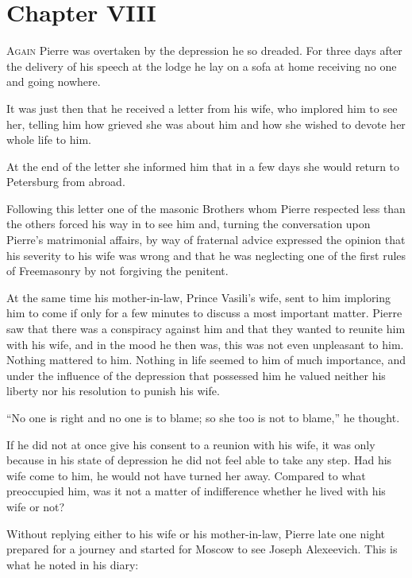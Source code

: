 \chapter*{Chapter VIII}
\ifaudio     
{} 
\fi

\lettrine[lines=2, loversize=0.3, lraise=0]{\initfamily A}{gain}
Pierre was overtaken by the depression he so dreaded. For
three days after the delivery of his speech at the lodge he lay
on a sofa at home receiving no one and going nowhere.

It was just then that he received a letter from his wife, who
implored him to see her, telling him how grieved she was about
him and how she wished to devote her whole life to him.

At the end of the letter she informed him that in a few days she
would return to Petersburg from abroad.

Following this letter one of the masonic Brothers whom Pierre
respected less than the others forced his way in to see him and,
turning the conversation upon Pierre's matrimonial affairs, by
way of fraternal advice expressed the opinion that his severity
to his wife was wrong and that he was neglecting one of the first
rules of Freemasonry by not forgiving the penitent.

At the same time his mother-in-law, Prince Vasili's wife, sent to
him imploring him to come if only for a few minutes to discuss a
most important matter. Pierre saw that there was a conspiracy
against him and that they wanted to reunite him with his wife,
and in the mood he then was, this was not even unpleasant to
him. Nothing mattered to him.  Nothing in life seemed to him of
much importance, and under the influence of the depression that
possessed him he valued neither his liberty nor his resolution to
punish his wife.

``No one is right and no one is to blame; so she too is not to
blame,'' he thought.

If he did not at once give his consent to a reunion with his
wife, it was only because in his state of depression he did not
feel able to take any step. Had his wife come to him, he would
not have turned her away.  Compared to what preoccupied him, was
it not a matter of indifference whether he lived with his wife or
not?

Without replying either to his wife or his mother-in-law, Pierre
late one night prepared for a journey and started for Moscow to
see Joseph Alexeevich. This is what he noted in his diary:

